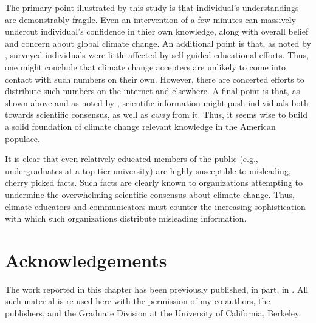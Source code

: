 The primary point illustrated by this study is that individual's understandings
are demonstrably fragile. Even an intervention of a few minutes can massively
undercut individual's confidence in thier own knowledge, along with overall
belief and concern about global climate change. An additional point is that, as
noted by \textcite{kahan_polarizing_2012,mccright_politicization_2011}, surveyed
individuals were little-affected by self-guided educational efforts. Thus, one
might conclude that climate change accepters are unlikely to come into contact
with such numbers on their own.  However, there are concerted efforts to
distribute such numbers on the internet and elsewhere. A final point is that, as
shown above and as noted by \textcite{mccright_politicization_2011}, scientific
information might push individuals both towards scientific consensus, as well as
\emph{away} from it.  Thus, it seems wise to build a solid foundation of climate
change relevant knowledge in the American populace. 

It is clear that even relatively educated members of the public (e.g.,
undergraduates at a top-tier university) are highly susceptible to misleading,
cherry picked facts. Such facts are clearly known to organizations attempting to
undermine the overwhelming scientific consensus about climate change. Thus,
climate educators and communicators must counter the increasing sophistication
with which such organizations distribute misleading information.

\section*{Acknowledgements}

The work reported in this chapter has been previously published, in part, in
\textcite{clark_knowledge_inpress}.  All such material is re-used here with the
permission of my co-authors, the publishers, and the Graduate Division at the
University of California, Berkeley.
